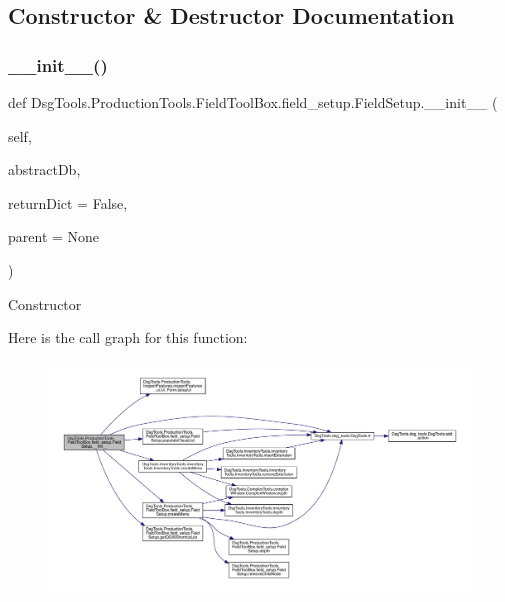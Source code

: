 \subsection{Constructor \& Destructor Documentation}
\mbox{\label{class_dsg_tools_1_1_production_tools_1_1_field_tool_box_1_1field__setup_1_1_field_setup_a7b9b3d0d6d1ec937376d265919a0b37f}} 
\subsubsection{\texorpdfstring{\+\_\+\+\_\+init\+\_\+\+\_\+()}{\_\_init\_\_()}}
{\footnotesize\ttfamily def Dsg\+Tools.\+Production\+Tools.\+Field\+Tool\+Box.\+field\+\_\+setup.\+Field\+Setup.\+\_\+\+\_\+init\+\_\+\+\_\+ (\begin{DoxyParamCaption}\item[{}]{self,  }\item[{}]{abstract\+Db,  }\item[{}]{return\+Dict = {\ttfamily False},  }\item[{}]{parent = {\ttfamily None} }\end{DoxyParamCaption})}

\begin{DoxyVerb}Constructor
\end{DoxyVerb}
 Here is the call graph for this function\+:
\nopagebreak
\begin{figure}[H]
\begin{center}
\leavevmode
\includegraphics[width=350pt]{class_dsg_tools_1_1_production_tools_1_1_field_tool_box_1_1field__setup_1_1_field_setup_a7b9b3d0d6d1ec937376d265919a0b37f_cgraph}
\end{center}
\end{figure}


